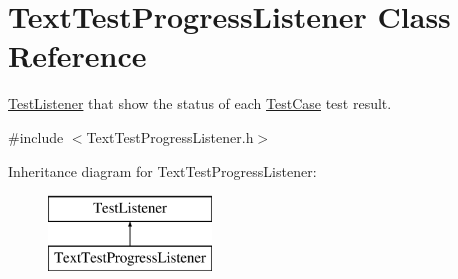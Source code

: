 \hypertarget{class_text_test_progress_listener}{}\section{Text\+Test\+Progress\+Listener Class Reference}
\label{class_text_test_progress_listener}


\hyperlink{class_test_listener}{Test\+Listener} that show the status of each \hyperlink{class_test_case}{Test\+Case} test result.  




{\ttfamily \#include $<$Text\+Test\+Progress\+Listener.\+h$>$}

Inheritance diagram for Text\+Test\+Progress\+Listener\+:\begin{figure}[H]
\begin{center}
\leavevmode
\includegraphics[height=2.000000cm]{class_text_test_progress_listener}
\end{center}
\end{figure}

